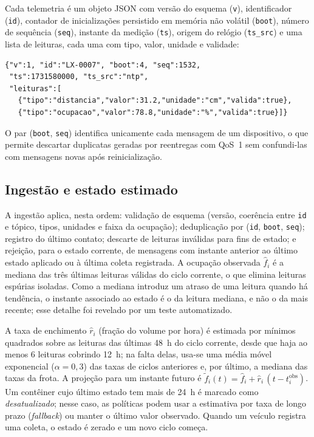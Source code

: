 Cada telemetria é um objeto JSON com versão do esquema (\texttt{v}),
identificador (\texttt{id}), contador de inicializações persistido em memória
não volátil (\texttt{boot}), número de sequência (\texttt{seq}), instante da
medição (\texttt{ts}), origem do relógio (\texttt{ts\_src}) e uma lista de
leituras, cada uma com tipo, valor, unidade e validade:

\begin{footnotesize}
\begin{verbatim}
{"v":1, "id":"LX-0007", "boot":4, "seq":1532,
 "ts":1731580000, "ts_src":"ntp",
 "leituras":[
   {"tipo":"distancia","valor":31.2,"unidade":"cm","valida":true},
   {"tipo":"ocupacao","valor":78.8,"unidade":"%","valida":true}]}
\end{verbatim}
\end{footnotesize}

O par (\texttt{boot}, \texttt{seq}) identifica unicamente cada mensagem de um
dispositivo, o que permite descartar duplicatas geradas por reentregas com
QoS~1 sem confundi-las com mensagens novas após reinicialização.

\subsection{Ingestão e estado estimado}

A ingestão aplica, nesta ordem: validação de esquema (versão, coerência entre
\texttt{id} e tópico, tipos, unidades e faixa da ocupação); deduplicação por
(\texttt{id}, \texttt{boot}, \texttt{seq}); registro do último contato; descarte
de leituras inválidas para fins de estado; e rejeição, para o estado corrente,
de mensagens com instante anterior ao último estado aplicado ou à última coleta
registrada. A ocupação observada $\hat f_i$ é a mediana das três últimas
leituras válidas do ciclo corrente, o que elimina leituras espúrias isoladas.
Como a mediana introduz um atraso de uma leitura quando há tendência, o
instante associado ao estado é o da leitura mediana, e não o da mais recente;
esse detalhe foi revelado por um teste automatizado.

A taxa de enchimento $\hat r_i$ (fração do volume por hora) é estimada por
mínimos quadrados sobre as leituras das últimas 48~h do ciclo corrente, desde
que haja ao menos 6 leituras cobrindo 12~h; na falta delas, usa-se uma média
móvel exponencial ($\alpha = 0{,}3$) das taxas de ciclos anteriores e, por
último, a mediana das taxas da frota. A projeção para um instante futuro é
$\tilde f_i(t) = \hat f_i + \hat r_i\,(t - t^{\mathrm{obs}}_i)$. Um contêiner
cujo último estado tem mais de 24~h é marcado como \emph{desatualizado}; nesse
caso, as políticas podem usar a estimativa por taxa de longo prazo
(\emph{fallback}) ou manter o último valor observado. Quando um veículo
registra uma coleta, o estado é zerado e um novo ciclo começa.

